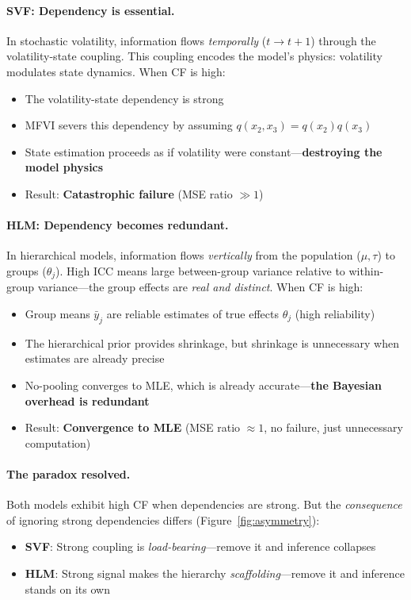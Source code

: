 \documentclass[10pt]{article} %
\theoremstyle{plain}
\theoremstyle{definition}
\begin{document}
\paragraph{SVF: Dependency is essential.} In stochastic volatility, information flows \emph{temporally} ($t \to t+1$) through the volatility-state coupling. This coupling encodes the model's physics: volatility modulates state dynamics. When CF is high:
\begin{itemize}
    \item The volatility-state dependency is strong
    \item MFVI severs this dependency by assuming $q(x_2, x_3) = q(x_2)q(x_3)$
    \item State estimation proceeds as if volatility were constant---\textbf{destroying the model physics}
    \item Result: \textbf{Catastrophic failure} (MSE ratio $\gg 1$)
\end{itemize}

\paragraph{HLM: Dependency becomes redundant.} In hierarchical models, information flows \emph{vertically} from the population ($\mu, \tau$) to groups ($\theta_j$). High ICC means large between-group variance relative to within-group variance---the group effects are \emph{real and distinct}. When CF is high:
\begin{itemize}
    \item Group means $\bar{y}_j$ are reliable estimates of true effects $\theta_j$ (high reliability)
    \item The hierarchical prior provides shrinkage, but shrinkage is unnecessary when estimates are already precise
    \item No-pooling converges to MLE, which is already accurate---\textbf{the Bayesian overhead is redundant}
    \item Result: \textbf{Convergence to MLE} (MSE ratio $\approx 1$, no failure, just unnecessary computation)
\end{itemize}

\paragraph{The paradox resolved.} Both models exhibit high CF when dependencies are strong. But the \emph{consequence} of ignoring strong dependencies differs (Figure~\ref{fig:asymmetry}):
\begin{itemize}
    \item \textbf{SVF}: Strong coupling is \emph{load-bearing}---remove it and inference collapses
    \item \textbf{HLM}: Strong signal makes the hierarchy \emph{scaffolding}---remove it and inference stands on its own
\end{itemize}
\end{document}
